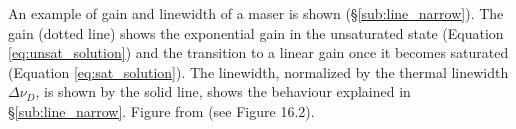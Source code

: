 \label{fig:maser_lwidth} An example of gain and linewidth of a maser is shown (\S\ref{sub:line_narrow}). The gain (dotted line) shows the exponential gain in the unsaturated state (Equation \ref{eq:unsat_solution}) and the transition to a linear gain once it becomes saturated (Equation \ref{eq:sat_solution}). The linewidth, normalized by the thermal linewidth $\Delta \nu_D$, is shown by the solid line, shows the behaviour explained in \S\ref{sub:line_narrow}. Figure from \citet{2004tra..book.....R} (see Figure 16.2).